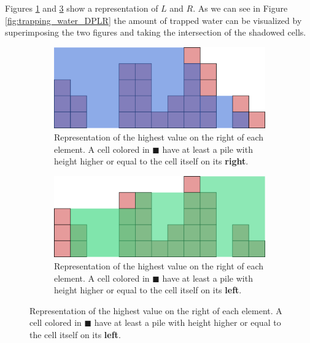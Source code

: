 Figures \ref{fig:trapping_water_DPL} and \ref{fig:trapping_water_DPR} show a representation of $L$ and $R$. As we can see in Figure \ref{fig:trapping_water_DPLR} the amount of trapped water can be visualized by superimposing the two figures and taking the intersection of the shadowed cells.


\begin{figure}
\centering
\begin{subfigure}[b]{0.95\textwidth}
   \includegraphics[width=1\linewidth]{sources/trapping_water/images/DPR}
   \caption{Representation of the highest value on the right of each element. A cell colored in \textcolor[HTML]{3268d5}{$\blacksquare$} have at least a pile with height higher or equal to the cell itself on its \textbf{right}. }
   \label{fig:trapping_water_DPL}
\end{subfigure}

\begin{subfigure}[b]{0.95\textwidth}
   \includegraphics[width=1\linewidth]{sources/trapping_water/images/DPL}
   \caption{Representation of the highest value on the right of each element. A cell colored in \textcolor[HTML]{32d579}{$\blacksquare$} have at least a pile with height higher or equal to the cell itself on its \textbf{left}.}
   \label{fig:trapping_water_DPR}
\end{subfigure}


\end{figure}
